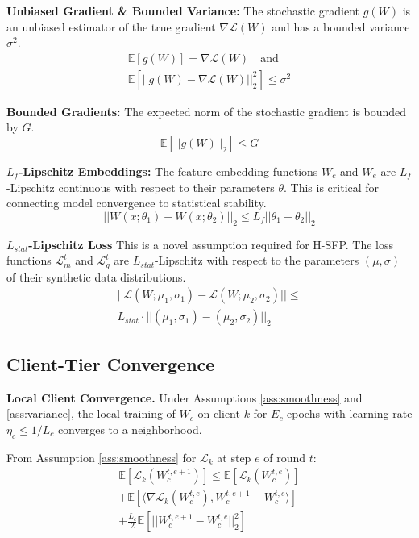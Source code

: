 \noindent\textbf{Unbiased Gradient \& Bounded Variance:}
The stochastic gradient $g(W)$ is an unbiased estimator of the true gradient $\nabla \mathcal{L}(W)$ and has a bounded variance $\sigma^2$.
\begin{multline}
    \label{ass:variance}
    \mathbb{E}[g(W)] = \nabla \mathcal{L}(W) \quad \text{and} \quad \\
    \mathbb{E}[||g(W) - \nabla \mathcal{L}(W)||_2^2] \le \sigma^2
\end{multline}

\noindent\textbf{Bounded Gradients:}
The expected norm of the stochastic gradient is bounded by $G$.
\begin{equation}
    \mathbb{E}[||g(W)||_2] \le G
    \label{ass:bounded_grad}
\end{equation}

\noindent\textbf{$L_f$-Lipschitz Embeddings:}
The feature embedding functions $W_c$ and $W_e$ are $L_f$-Lipschitz continuous with respect to their parameters $\theta$. This is critical for connecting model convergence to statistical stability.
\begin{equation}
    \label{ass:lipschitz_embed}
    ||W(x; \theta_1) - W(x; \theta_2)||_2 \le L_f ||\theta_1 - \theta_2||_2
\end{equation}

\noindent\textbf{$L_{stat}$-Lipschitz Loss}
This is a novel assumption required for H-SFP. The loss functions $\mathcal{L}_m^t$ and $\mathcal{L}_g^t$ are $L_{stat}$-Lipschitz with respect to the parameters $(\mu, \sigma)$ of their synthetic data distributions.
\begin{multline}
    \label{ass:lipschitz_loss}
    ||\mathcal{L}(W; \mu_1, \sigma_1) - \mathcal{L}(W; \mu_2, \sigma_2)|| \le \\
    L_{stat} \cdot ||(\mu_1, \sigma_1) - (\mu_2, \sigma_2)||_2
\end{multline}


\subsection*{Client-Tier Convergence}
\label{sec:part1}

\noindent\textbf{Local Client Convergence.}
Under Assumptions \cref{ass:smoothness} and \cref{ass:variance}, the local training of $W_c$ on client $k$ for $E_c$ epochs with learning rate $\eta_c \le 1/L_c$ converges to a neighborhood.

From Assumption \cref{ass:smoothness} for $\mathcal{L}_k$ at step $e$ of round $t$:
\begin{multline}
    \mathbb{E}[\mathcal{L}_k(W_c^{t,e+1})] \le \mathbb{E}[\mathcal{L}_k(W_c^{t,e})] \\
    + \mathbb{E}[\langle \nabla \mathcal{L}_k(W_c^{t,e}), W_c^{t,e+1} - W_c^{t,e} \rangle] \\
    + \frac{L_c}{2} \mathbb{E}[||W_c^{t,e+1} - W_c^{t,e}||_2^2]
\end{multline}
    

